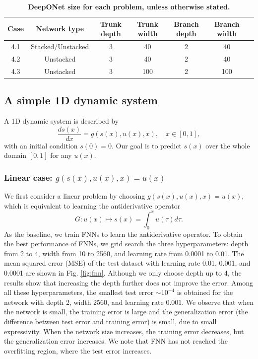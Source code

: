 \documentclass[11pt]{article}
\begin{document}
\begin{table}[htbp]
\centering
\caption{\textbf{DeepONet size for each problem, unless otherwise stated.}}
\label{tab:DeepONet}
\begin{tabular}{c|cccccc}
\toprule
Case & Network type & Trunk depth & Trunk width & Branch depth & Branch width  \\
\midrule
4.1 & Stacked/Unstacked & 3 & 40 & 2 & 40 \\
4.2 & Unstacked & 3 & 40 & 2 & 40 \\
4.3 & Unstacked & 3 & 100 & 2 & 100 \\
\bottomrule
\end{tabular}
\end{table}

\subsection{A simple 1D dynamic system}

A 1D dynamic system is described by
$$\frac{ds(x)}{dx} = g(s(x), u(x), x), \quad x \in [0, 1],$$
with an initial condition $s(0)=0$. Our goal is to predict $s(x)$ over the whole domain $[0, 1]$ for any $u(x)$.

\subsubsection{Linear case: $g(s(x), u(x), x) = u(x)$}
\label{sec:antiderivative}

We first consider a linear problem by choosing $g(s(x), u(x), x) = u(x)$, which is equivalent to learning the antiderivative operator
$$G: u(x) \mapsto s(x) = \int_0^x u(\tau) d\tau.$$
As the baseline, we train FNNs to learn the antiderivative operator. To obtain the best performance of FNNs, we grid search the three hyperparameters: depth from 2 to 4, width from 10 to 2560, and learning rate from 0.0001 to 0.01. The mean squared error (MSE) of the test dataset with learning rate 0.01, 0.001, and 0.0001 are shown in Fig. \ref{fig:fnn}. Although we only choose depth up to 4, the results show that increasing the depth further does not improve the error. Among all these hyperparameters, the smallest test error $\sim 10^{-4}$ is obtained for the network with depth 2, width 2560, and learning rate 0.001. We observe that when the network is small, the training error is large and the generalization error (the difference between test error and training error) is small, due to small expressivity. When the network size increases, the training error decreases, but the generalization error increases. We note that FNN has not reached the overfitting region, where the test error increases.
\end{document}

